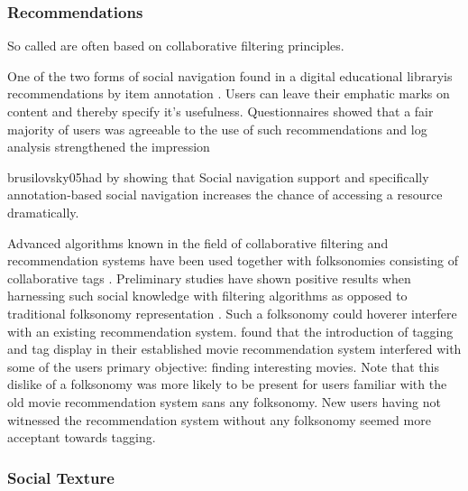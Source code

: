 \subsubsection{Recommendations}
\label{section:background.social.navigation.applied.forms.recommendations}

So called  are often based on collaborative
filtering principles. %

One of the two forms of social navigation found in
\dash{}a digital educational
library\dash{}is recommendations by item
annotation \citep[]{brusilovsky05}. Users can leave their emphatic marks
on content and thereby specify it's usefulness. Questionnaires showed that a
fair majority of users was agreeable to the use of such recommendations
\citeyearpar[]{brusilovsky05} and log analysis strengthened
the impression
\begin{fullquote}[\p{38}]{brusilovsky05}{had by showing that}
  Social navigation support and specifically
  annotation-based social navigation increases the chance of
  accessing a resource dramatically.
\end{fullquote}

Advanced algorithms known in the field of collaborative filtering
and recommendation systems have been used together with folksonomies
consisting of collaborative tags
\citep[]{wu06}. Preliminary studies have shown positive
results when harnessing such social knowledge with filtering algorithms
as opposed to traditional folksonomy representation
\citep[]{wu06}. Such a folksonomy could hoverer interfere with an
existing recommendation system. \citet[]{sen06} found that the
introduction of tagging and tag display in their established
movie recommendation system interfered with some of the users primary
objective: finding interesting movies. Note that this dislike of a
folksonomy was more likely to be present for users familiar with the old
movie recommendation system sans any folksonomy. New users having not
witnessed the recommendation system without any folksonomy seemed more
acceptant towards tagging.

\subsubsection{Social Texture}

